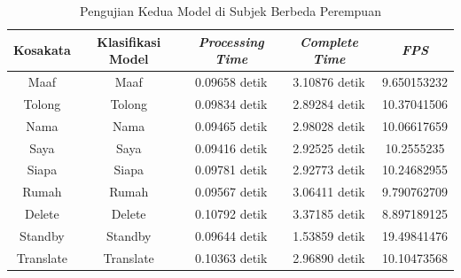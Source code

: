 \begin{longtable}{|c|c|c|c|c|}
  \caption{Pengujian Kedua Model di Subjek Berbeda Perempuan}
  \label{tb:prediksiperempuan2}                                   \\
  \hline
  \rowcolor[HTML]{C0C0C0}
  \textbf{Kosakata} & \textbf{Klasifikasi Model} & \textbf{\emph{Processing Time}} & \textbf{\emph{Complete Time}} & \textbf{\emph{FPS}}\\
  \hline
  Maaf              & Maaf                          & 0.09658 detik                           & 3.10876 detik                                  & 9.650153232\\
  Tolong            & Tolong                        & 0.09834 detik                           & 2.89284 detik                                  & 10.37041506\\
  Nama              & Nama                          & 0.09465 detik                           & 2.98028 detik                                  & 10.06617659\\
  Saya              & Saya                          & 0.09416 detik                           & 2.92525 detik                                  & 10.2555235\\
  Siapa             & Siapa                         & 0.09781 detik                           & 2.92773 detik                                  & 10.24682955\\
  Rumah             & Rumah                         & 0.09567 detik                           & 3.06411 detik                                  & 9.790762709\\
  Delete            & Delete                        & 0.10792 detik                           & 3.37185 detik                                  & 8.897189125\\
  Standby           & Standby                       & 0.09644 detik                           & 1.53859 detik                                  & 19.49841476\\
  Translate         & Translate                     & 0.10363 detik                           & 2.96890 detik                                  & 10.10473568\\
  \hline
\end{longtable}



